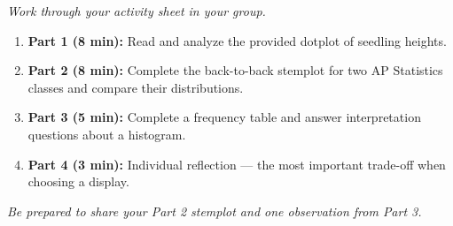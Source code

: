 \documentclass[aspectratio=169, 11pt]{beamer}
\begin{document}
{
\begin{frame}[t, plain]
  \hspace{0.55cm}%
  \begin{minipage}{0.9\textwidth}
    \vspace{0.3em}\small
    \textit{Work through your activity sheet in your group.}

    \vspace{0.4cm}
    \begin{enumerate}
      \setlength{\itemsep}{0.5em}
      \item \textbf{Part 1 (8 min):} Read and analyze the provided dotplot of
            seedling heights.
      \item \textbf{Part 2 (8 min):} Complete the back-to-back stemplot for two
            AP Statistics classes and compare their distributions.
      \item \textbf{Part 3 (5 min):} Complete a frequency table and answer
            interpretation questions about a histogram.
      \item \textbf{Part 4 (3 min):} Individual reflection --- the most important
            trade-off when choosing a display.
    \end{enumerate}

    \vspace{0.4cm}
    {\color{navy}\itshape\small
      Be prepared to share your Part 2 stemplot and one observation from Part 3.}
  \end{minipage}
\end{frame}
}
\end{document}
